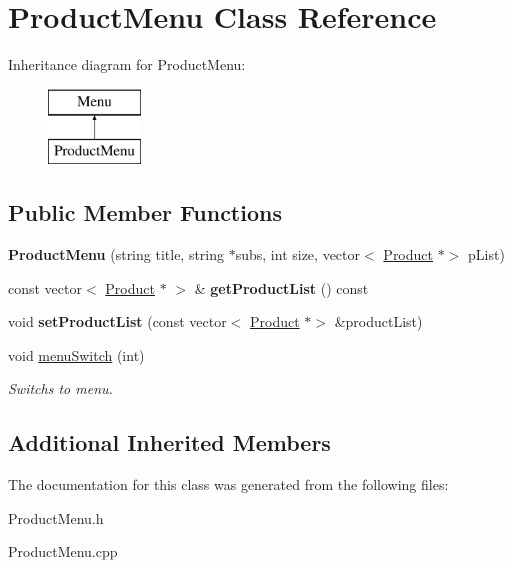 \hypertarget{classProductMenu}{}\section{Product\+Menu Class Reference}
\label{classProductMenu}
Inheritance diagram for Product\+Menu\+:\begin{figure}[H]
\begin{center}
\leavevmode
\includegraphics[height=2.000000cm]{classProductMenu}
\end{center}
\end{figure}
\subsection*{Public Member Functions}
\begin{DoxyCompactItemize}
\item 
\mbox{\label{classProductMenu_a82b4acc7ccba704e2a54d3259b361230}} 
{\bfseries Product\+Menu} (string title, string $\ast$subs, int size, vector$<$ \hyperlink{classProduct}{Product} $\ast$$>$ p\+List)
\item 
\mbox{\label{classProductMenu_a0f8a319dae390c983d728219cf845aef}} 
const vector$<$ \hyperlink{classProduct}{Product} $\ast$ $>$ \& {\bfseries get\+Product\+List} () const
\item 
\mbox{\label{classProductMenu_a4aaea1df5f79ec3d744c1810a6ab03e2}} 
void {\bfseries set\+Product\+List} (const vector$<$ \hyperlink{classProduct}{Product} $\ast$$>$ \&product\+List)
\item 
\mbox{\label{classProductMenu_a24a18c11760a828b7b7de4acc22bcce5}} 
void \hyperlink{classProductMenu_a24a18c11760a828b7b7de4acc22bcce5}{menu\+Switch} (int)
\begin{DoxyCompactList}\small\item\em Switchs to menu. \end{DoxyCompactList}\end{DoxyCompactItemize}
\subsection*{Additional Inherited Members}


The documentation for this class was generated from the following files\+:\begin{DoxyCompactItemize}
\item 
Product\+Menu.\+h\item 
Product\+Menu.\+cpp\end{DoxyCompactItemize}

